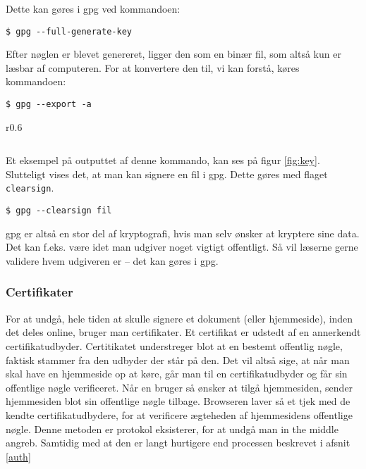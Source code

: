     Dette kan gøres i gpg ved kommandoen:
    \begin{verbatim}
$ gpg --full-generate-key
    \end{verbatim}


    Efter nøglen er blevet genereret, ligger den som en binær fil, som altså kun er læsbar af computeren.
    For at konvertere den til, vi kan forstå, køres kommandoen:
    \begin{verbatim}
$ gpg --export -a
    \end{verbatim}

    \begin{wrapfigure}{r}{0.6\textwidth}
        \vspace{-30pt}
        \begin{center}
            \inputminted[python3, breaklines, fontsize=\scriptsize]{bash}{src/public.key}
            \vspace{-20pt}
            \caption{1024-bit nøgle genereret i gpg}
            \label{fig:key}
        \end{center}
        \vspace{-100pt}
    \end{wrapfigure}

    Et eksempel på outputtet af denne kommando, kan ses på figur \ref{fig:key}.\\

    Slutteligt vises det, at man kan signere en fil i gpg.
    Dette gøres med flaget \texttt{clearsign}.
    \begin{verbatim}
$ gpg --clearsign fil
    \end{verbatim}

    gpg er altså en stor del af kryptografi, hvis man selv ønsker at kryptere sine data.
    Det kan f.eks. være idet man udgiver noget vigtigt offentligt.
    Så vil læserne gerne validere hvem udgiveren er -- det kan gøres i gpg.\\

    \subsubsection{Certifikater}
    For at undgå, hele tiden at skulle signere et dokument (eller hjemmeside), inden det deles online, bruger man certifikater.\cite{cert}
    Et certifikat er udstedt af en annerkendt certifikatudbyder.
    Certitikatet understreger blot at en bestemt offentlig nøgle, faktisk stammer fra den udbyder der står på den.
    Det vil altså sige, at når man skal have en hjemmeside op at køre, går man til en certifikatudbyder og får sin offentlige nøgle verificeret.
    Når en bruger så ønsker at tilgå hjemmesiden, sender hjemmesiden blot sin offentlige nøgle tilbage.
    Browseren laver så et tjek med de kendte certifikatudbydere, for at verificere ægteheden af hjemmesidens offentlige nøgle.
    Denne metoden er protokol eksisterer, for at undgå man in the middle angreb.
    Samtidig med at den er langt hurtigere end processen beskrevet i afsnit \ref{auth} 





